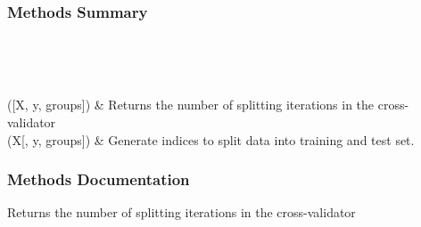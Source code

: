 \documentclass[letterpaper,10pt,english]{sphinxmanual}
\begin{document}
\begin{fulllineitems}
\begin{description}
\begin{description}
\end{description}

\end{description}
\subsubsection*{Methods Summary}


\begin{savenotes}\sphinxatlongtablestart\begin{longtable}[c]{}
\hline

\endfirsthead

%
{}\\
\hline

\endhead

\hline
{}\\
\endfoot

\endlastfoot

{\hyperref[\detokenize{api/mastml.data_splitters.NoSplit:mastml.data_splitters.NoSplit.get_n_splits}]{}}({[}X, y, groups{]})
&
Returns the number of splitting iterations in the cross-validator
\\
\hline
{\hyperref[\detokenize{api/mastml.data_splitters.NoSplit:mastml.data_splitters.NoSplit.split}]{}}(X{[}, y, groups{]})
&
Generate indices to split data into training and test set.
\\
\hline
\end{longtable}\sphinxatlongtableend\end{savenotes}
\subsubsection*{Methods Documentation}

\begin{fulllineitems}
\label{\detokenize{api/mastml.data_splitters.NoSplit:mastml.data_splitters.NoSplit.get_n_splits}}
Returns the number of splitting iterations in the cross-validator


\end{fulllineitems}
\end{fulllineitems}
\end{document}
